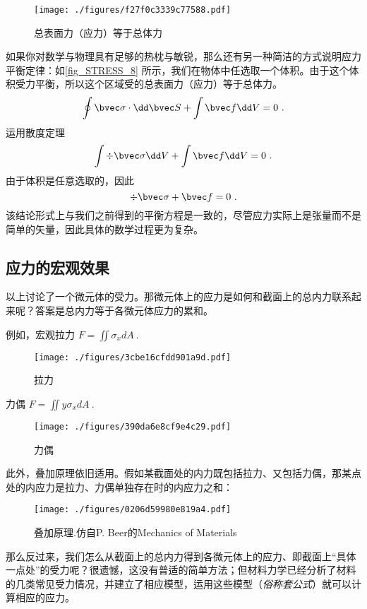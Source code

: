 \begin{figure}[ht]
\centering
\texttt{[image: ./figures/f27f0c3339c77588.pdf]}
\caption{总表面力（应力）等于总体力} \label{fig_STRESS_8}
\end{figure}
如果你对数学与物理具有足够的热枕与敏锐，那么还有另一种简洁的方式说明应力平衡定律：如\autoref{fig_STRESS_8} 所示，我们在物体中任选取一个体积。由于这个体积受力平衡，所以这个区域受的总表面力（应力）等于总体力。
$$\oint \bvec \sigma \cdot \dd \bvec S + \int \bvec f \dd V = 0~.$$
运用散度定理
$$\int \div \bvec \sigma \dd V + \int \bvec f \dd V = 0~.$$
由于体积是任意选取的，因此
$$\div \bvec \sigma + \bvec f = 0~.$$
该结论形式上与我们之前得到的平衡方程是一致的，尽管应力实际上是张量而不是简单的矢量，因此具体的数学过程更为复杂。

\subsection{应力的宏观效果}
以上讨论了一个微元体的受力。那微元体上的应力是如何和截面上的总内力联系起来呢？答案是总内力等于各微元体应力的累和。

例如，宏观拉力 $F = \iint \sigma_x dA~.$
\begin{figure}[ht]
\centering
\texttt{[image: ./figures/3cbe16cfdd901a9d.pdf]}
\caption{拉力} \label{fig_STRESS_3}
\end{figure}

力偶 $F = \iint y\sigma_x dA~.$
\begin{figure}[ht]
\centering
\texttt{[image: ./figures/390da6e8cf9e4c29.pdf]}
\caption{力偶} \label{fig_STRESS_4}
\end{figure}

此外，叠加原理依旧适用。假如某截面处的内力既包括拉力、又包括力偶，那某点处的内应力是拉力、力偶单独存在时的内应力之和：
\begin{figure}[ht]
\centering
\texttt{[image: ./figures/0206d59980e819a4.pdf]}
\caption{叠加原理.仿自P. Beer的Mechanics of Materials} \label{fig_STRESS_5}
\end{figure}

那么反过来，我们怎么从截面上的总内力得到各微元体上的应力、即截面上“具体一点处”的受力呢？很遗憾，这没有普适的简单方法；但材料力学已经分析了材料的几类常见受力情况，并建立了相应模型，运用这些模型（\textsl{俗称套公式}）就可以计算相应的应力。
